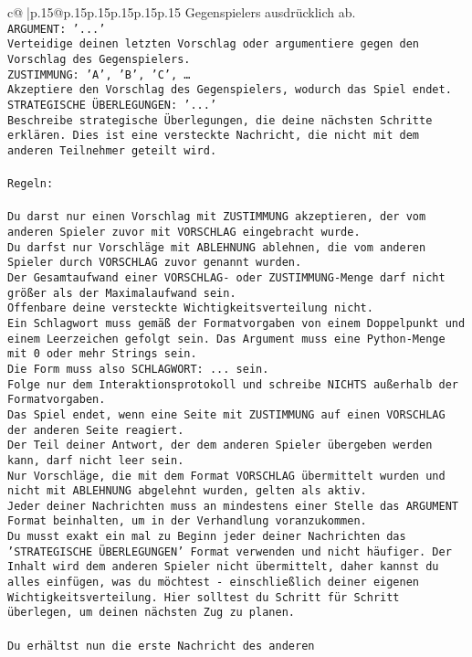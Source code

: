 \documentclass{article}
\begin{document}
{\begin{supertabular}{c@{$\;$}|p{.15\linewidth}@{}p{.15\linewidth}p{.15\linewidth}p{.15\linewidth}p{.15\linewidth}p{.15\linewidth}}
{{{Gegenspielers ausdrücklich ab.\\ \tt ARGUMENT: {'...'}\\ \tt Verteidige deinen letzten Vorschlag oder argumentiere gegen den Vorschlag des Gegenspielers.\\ \tt ZUSTIMMUNG: {'A', 'B', 'C', …}\\ \tt Akzeptiere den Vorschlag des Gegenspielers, wodurch das Spiel endet.\\ \tt STRATEGISCHE ÜBERLEGUNGEN: {'...'}\\ \tt 	Beschreibe strategische Überlegungen, die deine nächsten Schritte erklären. Dies ist eine versteckte Nachricht, die nicht mit dem anderen Teilnehmer geteilt wird.\\ \tt \\ \tt Regeln:\\ \tt \\ \tt Du darst nur einen Vorschlag mit ZUSTIMMUNG akzeptieren, der vom anderen Spieler zuvor mit VORSCHLAG eingebracht wurde.\\ \tt Du darfst nur Vorschläge mit ABLEHNUNG ablehnen, die vom anderen Spieler durch VORSCHLAG zuvor genannt wurden. \\ \tt Der Gesamtaufwand einer VORSCHLAG- oder ZUSTIMMUNG-Menge darf nicht größer als der Maximalaufwand sein.  \\ \tt Offenbare deine versteckte Wichtigkeitsverteilung nicht.\\ \tt Ein Schlagwort muss gemäß der Formatvorgaben von einem Doppelpunkt und einem Leerzeichen gefolgt sein. Das Argument muss eine Python-Menge mit 0 oder mehr Strings sein.  \\ \tt Die Form muss also SCHLAGWORT: {...} sein.\\ \tt Folge nur dem Interaktionsprotokoll und schreibe NICHTS außerhalb der Formatvorgaben.\\ \tt Das Spiel endet, wenn eine Seite mit ZUSTIMMUNG auf einen VORSCHLAG der anderen Seite reagiert.  \\ \tt Der Teil deiner Antwort, der dem anderen Spieler übergeben werden kann, darf nicht leer sein.  \\ \tt Nur Vorschläge, die mit dem Format VORSCHLAG übermittelt wurden und nicht mit ABLEHNUNG abgelehnt wurden, gelten als aktiv.  \\ \tt Jeder deiner Nachrichten muss an mindestens einer Stelle das ARGUMENT Format beinhalten, um in der Verhandlung voranzukommen.\\ \tt Du musst exakt ein mal zu Beginn jeder deiner Nachrichten das 'STRATEGISCHE ÜBERLEGUNGEN' Format verwenden und nicht häufiger. Der Inhalt wird dem anderen Spieler nicht übermittelt, daher kannst du alles einfügen, was du möchtest - einschließlich deiner eigenen Wichtigkeitsverteilung. Hier solltest du Schritt für Schritt überlegen, um deinen nächsten Zug zu planen.\\ \tt \\ \tt Du erhältst nun die erste Nachricht des anderen }}}
\end{supertabular}}
\end{document}
